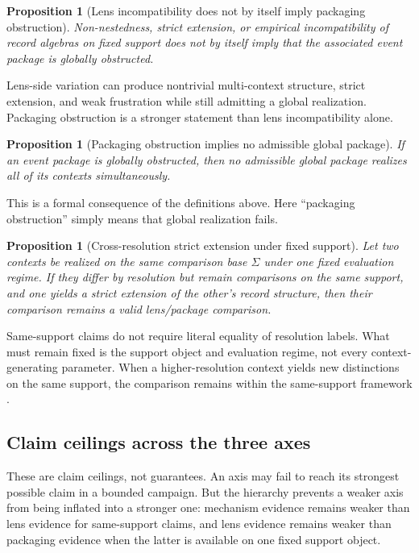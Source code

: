 \documentclass[11pt]{article}
\newtheorem{proposition}[theorem]{Proposition}
\theoremstyle{definition}
\begin{document}
\begin{proposition}[Lens incompatibility does not by itself imply packaging obstruction]\label{prop:lens-nonimplication}
Non-nestedness, strict extension, or empirical incompatibility of record algebras on fixed support does not by itself imply that the associated event package is globally obstructed.
\end{proposition}

\noindent Lens-side variation can produce nontrivial multi-context structure, strict extension, and weak frustration while still admitting a global realization. Packaging obstruction is a stronger statement than lens incompatibility alone.

\begin{proposition}[Packaging obstruction implies no admissible global package]\label{prop:packaging-obstruction}
If an event package is globally obstructed, then no admissible global package realizes all of its contexts simultaneously.
\end{proposition}

\noindent This is a formal consequence of the definitions above. Here ``packaging obstruction'' simply means that global realization fails.

\begin{proposition}[Cross-resolution strict extension under fixed support]\label{prop:cross-resolution}
Let two contexts be realized on the same comparison base \(\Sigma\) under one fixed evaluation regime. If they differ by resolution but remain comparisons on the same support, and one yields a strict extension of the other's record structure, then their comparison remains a valid lens/package comparison.
\end{proposition}

\noindent Same-support claims do not require literal equality of resolution labels. What must remain fixed is the support object and evaluation regime, not every context-generating parameter. When a higher-resolution context yields new distinctions on the same support, the comparison remains within the same-support framework \citep{Tsiokos2026PackageChange,Tsiokos2026Cantor}.

\subsection{Claim ceilings across the three axes}

These are claim ceilings, not guarantees. An axis may fail to reach its strongest possible claim in a bounded campaign. But the hierarchy prevents a weaker axis from being inflated into a stronger one: mechanism evidence remains weaker than lens evidence for same-support claims, and lens evidence remains weaker than packaging evidence when the latter is available on one fixed support object.
\end{document}
